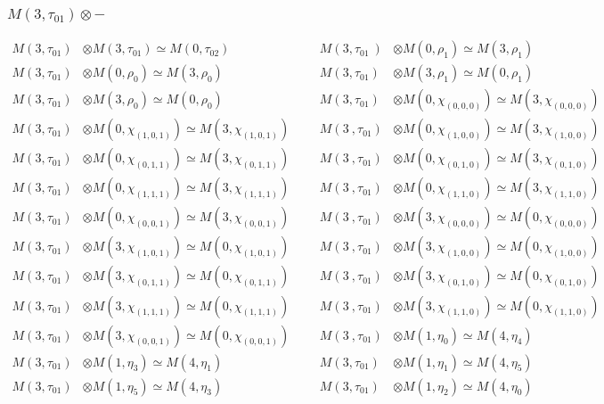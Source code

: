\subsubsection{$M(3,\tau_{01})\otimes -$}
\begin{align*}
M(3,\tau_{01}) &\otimes M(3,\tau_{01}) \simeq M(0,\tau_{02}) &&& M(3,\tau_{01}\
) &\otimes M(0,\rho_{1}) \simeq M(3,\rho_{1})\\
M(3,\tau_{01}) &\otimes M(0,\rho_{0}) \simeq M(3,\rho_{0}) &&& M(3,\tau_{01}) \
&\otimes M(3,\rho_{1}) \simeq M(0,\rho_{1})\\
M(3,\tau_{01}) &\otimes M(3,\rho_{0}) \simeq M(0,\rho_{0}) &&& M(3,\tau_{01}) \
&\otimes M(0,\chi_{(0,0,0)}) \simeq M(3,\chi_{(0,0,0)})\\
M(3,\tau_{01}) &\otimes M(0,\chi_{(1,0,1)}) \simeq M(3,\chi_{(1,0,1)}) &&& M(3\
,\tau_{01}) &\otimes M(0,\chi_{(1,0,0)}) \simeq M(3,\chi_{(1,0,0)})\\
M(3,\tau_{01}) &\otimes M(0,\chi_{(0,1,1)}) \simeq M(3,\chi_{(0,1,1)}) &&& M(3\
,\tau_{01}) &\otimes M(0,\chi_{(0,1,0)}) \simeq M(3,\chi_{(0,1,0)})\\
M(3,\tau_{01}) &\otimes M(0,\chi_{(1,1,1)}) \simeq M(3,\chi_{(1,1,1)}) &&& M(3\
,\tau_{01}) &\otimes M(0,\chi_{(1,1,0)}) \simeq M(3,\chi_{(1,1,0)})\\
M(3,\tau_{01}) &\otimes M(0,\chi_{(0,0,1)}) \simeq M(3,\chi_{(0,0,1)}) &&& M(3\
,\tau_{01}) &\otimes M(3,\chi_{(0,0,0)}) \simeq M(0,\chi_{(0,0,0)})\\
M(3,\tau_{01}) &\otimes M(3,\chi_{(1,0,1)}) \simeq M(0,\chi_{(1,0,1)}) &&& M(3\
,\tau_{01}) &\otimes M(3,\chi_{(1,0,0)}) \simeq M(0,\chi_{(1,0,0)})\\
M(3,\tau_{01}) &\otimes M(3,\chi_{(0,1,1)}) \simeq M(0,\chi_{(0,1,1)}) &&& M(3\
,\tau_{01}) &\otimes M(3,\chi_{(0,1,0)}) \simeq M(0,\chi_{(0,1,0)})\\
M(3,\tau_{01}) &\otimes M(3,\chi_{(1,1,1)}) \simeq M(0,\chi_{(1,1,1)}) &&& M(3\
,\tau_{01}) &\otimes M(3,\chi_{(1,1,0)}) \simeq M(0,\chi_{(1,1,0)})\\
M(3,\tau_{01}) &\otimes M(3,\chi_{(0,0,1)}) \simeq M(0,\chi_{(0,0,1)}) &&& M(3\
,\tau_{01}) &\otimes M(1,\eta_{0}) \simeq M(4,\eta_{4})\\
M(3,\tau_{01}) &\otimes M(1,\eta_{3}) \simeq M(4,\eta_{1}) &&& M(3,\tau_{01}) \
&\otimes M(1,\eta_{1}) \simeq M(4,\eta_{5})\\
M(3,\tau_{01}) &\otimes M(1,\eta_{5}) \simeq M(4,\eta_{3}) &&& M(3,\tau_{01}) \
&\otimes M(1,\eta_{2}) \simeq M(4,\eta_{0})\\

\end{align*}
